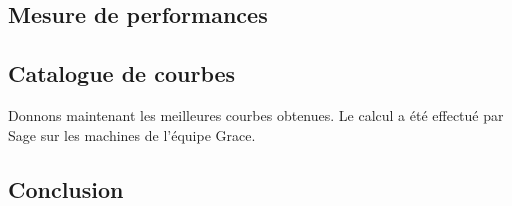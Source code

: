 \documentclass[11pt,a4paper]{article}
\theoremstyle{definition}
\begin{document}
\subsection{Mesure de performances}



\subsection{Catalogue de courbes}

Donnons maintenant les meilleures courbes obtenues. Le calcul a été effectué par Sage sur les machines de l'équipe Grace.



\subsection{Conclusion}

\newpage




\end{document}

